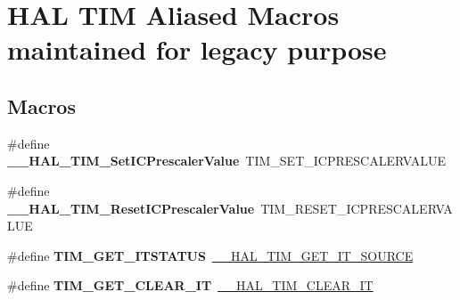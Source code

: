 \hypertarget{group___h_a_l___t_i_m___aliased___macros}{}\section{H\+AL T\+IM Aliased Macros maintained for legacy purpose}
\label{group___h_a_l___t_i_m___aliased___macros}
\subsection*{Macros}
\begin{DoxyCompactItemize}
\item 
\mbox{\label{group___h_a_l___t_i_m___aliased___macros_ga1f487f25516b3fd87b864f5be8229b7e}} 
\#define {\bfseries \+\_\+\+\_\+\+H\+A\+L\+\_\+\+T\+I\+M\+\_\+\+Set\+I\+C\+Prescaler\+Value}~T\+I\+M\+\_\+\+S\+E\+T\+\_\+\+I\+C\+P\+R\+E\+S\+C\+A\+L\+E\+R\+V\+A\+L\+UE
\item 
\mbox{\label{group___h_a_l___t_i_m___aliased___macros_gac171a25ce55eafe62671d40d7397d721}} 
\#define {\bfseries \+\_\+\+\_\+\+H\+A\+L\+\_\+\+T\+I\+M\+\_\+\+Reset\+I\+C\+Prescaler\+Value}~T\+I\+M\+\_\+\+R\+E\+S\+E\+T\+\_\+\+I\+C\+P\+R\+E\+S\+C\+A\+L\+E\+R\+V\+A\+L\+UE
\item 
\mbox{\label{group___h_a_l___t_i_m___aliased___macros_ga1dd7eae80b853d3526091193e81b4731}} 
\#define {\bfseries T\+I\+M\+\_\+\+G\+E\+T\+\_\+\+I\+T\+S\+T\+A\+T\+US}~\mbox{\hyperlink{group___t_i_m___exported___macros_ga644babf93470a6eee6bce8906c4da5c5}{\+\_\+\+\_\+\+H\+A\+L\+\_\+\+T\+I\+M\+\_\+\+G\+E\+T\+\_\+\+I\+T\+\_\+\+S\+O\+U\+R\+CE}}
\item 
\mbox{\label{group___h_a_l___t_i_m___aliased___macros_gadd580b2357a85c03653006349721a36e}} 
\#define {\bfseries T\+I\+M\+\_\+\+G\+E\+T\+\_\+\+C\+L\+E\+A\+R\+\_\+\+IT}~\mbox{\hyperlink{group___t_i_m___exported___macros_gaea68155ce77e591e0c2582def061d6f0}{\+\_\+\+\_\+\+H\+A\+L\+\_\+\+T\+I\+M\+\_\+\+C\+L\+E\+A\+R\+\_\+\+IT}}
\item 
\mbox{\label{group___h_a_l___t_i_m___aliased___macros_ga5b35f7cd15ac31c7b1a9596ac8521f36}} 

\end{DoxyCompactItemize}
